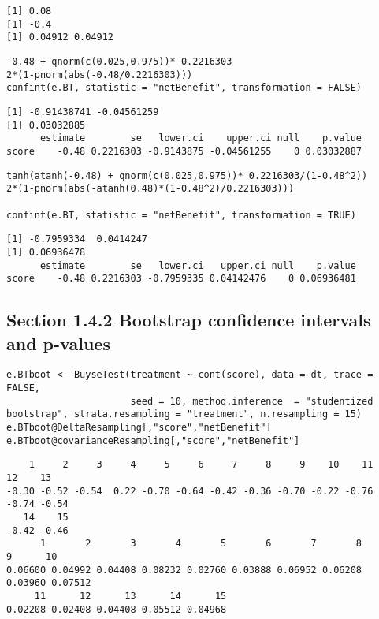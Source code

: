 \documentclass[12pt]{article}
\begin{document}
\begin{verbatim}
[1] 0.08
[1] -0.4
[1] 0.04912 0.04912
\end{verbatim}



\lstset{language=r,label= ,caption= ,captionpos=b,numbers=none}
\begin{lstlisting}
-0.48 + qnorm(c(0.025,0.975))* 0.2216303
2*(1-pnorm(abs(-0.48/0.2216303)))
confint(e.BT, statistic = "netBenefit", transformation = FALSE)
\end{lstlisting}

\begin{verbatim}
[1] -0.91438741 -0.04561259
[1] 0.03032885
      estimate        se   lower.ci    upper.ci null    p.value
score    -0.48 0.2216303 -0.9143875 -0.04561255    0 0.03032887
\end{verbatim}


\lstset{language=r,label= ,caption= ,captionpos=b,numbers=none}
\begin{lstlisting}
tanh(atanh(-0.48) + qnorm(c(0.025,0.975))* 0.2216303/(1-0.48^2))
2*(1-pnorm(abs(-atanh(0.48)*(1-0.48^2)/0.2216303)))

confint(e.BT, statistic = "netBenefit", transformation = TRUE)
\end{lstlisting}

\begin{verbatim}
[1] -0.7959334  0.0414247
[1] 0.06936478
      estimate        se   lower.ci   upper.ci null    p.value
score    -0.48 0.2216303 -0.7959335 0.04142476    0 0.06936481
\end{verbatim}

\subsection{Section 1.4.2 Bootstrap confidence intervals and p-values}
\label{sec:org133f1f1}
\lstset{language=r,label= ,caption= ,captionpos=b,numbers=none}
\begin{lstlisting}
e.BTboot <- BuyseTest(treatment ~ cont(score), data = dt, trace = FALSE,
                      seed = 10, method.inference  = "studentized bootstrap", strata.resampling = "treatment", n.resampling = 15)
e.BTboot@DeltaResampling[,"score","netBenefit"]
e.BTboot@covarianceResampling[,"score","netBenefit"]
\end{lstlisting}

\begin{verbatim}
    1     2     3     4     5     6     7     8     9    10    11    12    13 
-0.30 -0.52 -0.54  0.22 -0.70 -0.64 -0.42 -0.36 -0.70 -0.22 -0.76 -0.74 -0.54 
   14    15 
-0.42 -0.46
      1       2       3       4       5       6       7       8       9      10 
0.06600 0.04992 0.04408 0.08232 0.02760 0.03888 0.06952 0.06208 0.03960 0.07512 
     11      12      13      14      15 
0.02208 0.02408 0.04408 0.05512 0.04968
\end{verbatim}
\end{document}
